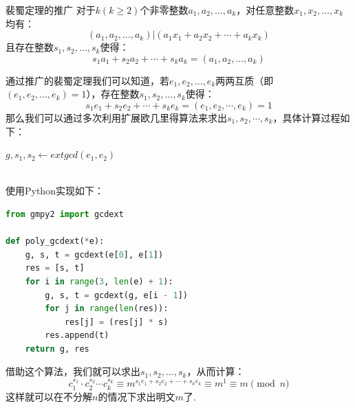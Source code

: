 \documentclass{book}
\numberwithin{equation}{subsubsection}
\begin{document}
\begin{concept}{裴蜀定理的推广}
    对于$k(k\ge2)$个非零整数$a_1,a_2,\ldots,a_k$，对任意整数$x_1,x_2,\ldots,x_k$均有：
    \begin{equation}
        (a_1,a_2,\ldots,a_k)|(a_1x_1+a_2x_2+\cdots+a_kx_k)
        \nonumber
    \end{equation}
    且存在整数$s_1,s_2,\ldots,s_k$使得：
    \begin{equation}
        s_1a_1+s_2a_2+\cdots+s_ka_k=(a_1,a_2,\ldots,a_k)
        \nonumber
    \end{equation}
\end{concept}

通过推广的裴蜀定理我们可以知道，若$e_1,e_2,\ldots,e_k$两两互质（即$(e_1,e_2,\ldots,e_k)=1$），存在整数$s_1,s_2,\ldots,s_k$使得：
\begin{equation}
    s_1e_1+s_2e_2+\cdots+s_ke_k=(e_1,e_2,\cdots,e_k)=1
    \nonumber
\end{equation}
那么我们可以通过多次利用扩展欧几里得算法来求出$s_1,s_2,\cdots,s_k$，具体计算过程如下：
\begin{algorithm}[h!]
    \caption{求解$s_1,s_2,\ldots,s_k$}
    $g, s_1, s_2 \leftarrow extgcd(e_1, e_2)$\\
\end{algorithm}\\
使用Python实现如下：
\begin{lstlisting}[language=Python,basicstyle=\ttfamily,breaklines=true,keywordstyle=\bfseries\color{blue}]
from gmpy2 import gcdext

def poly_gcdext(*e):
    g, s, t = gcdext(e[0], e[1])
    res = [s, t]
    for i in range(3, len(e) + 1):
        g, s, t = gcdext(g, e[i - 1])
        for j in range(len(res)):
            res[j] = (res[j] * s)
        res.append(t)
    return g, res
\end{lstlisting}
借助这个算法，我们就可以求出$s_1,s_2,\ldots,s_k$，从而计算：
\begin{equation}
    c_1^{s_1}\cdot c_2^{s_2}\cdots c_k^{s_k}\equiv m^{s_1e_1+s_2e_2+\cdots+s_ke_k}\equiv m^1\equiv m\pmod{n}
    \nonumber
\end{equation}
这样就可以在不分解$n$的情况下求出明文$m$了.\par
\end{document}
